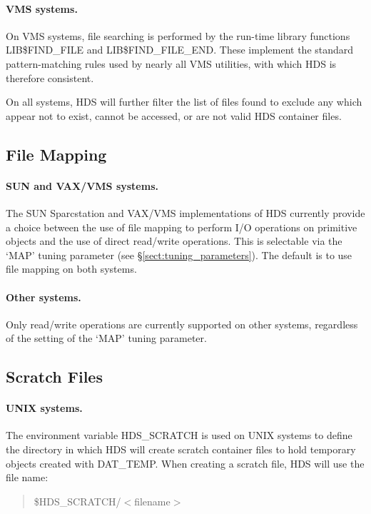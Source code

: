 \paragraph{VMS systems.} On VMS systems, file searching is performed by the
run-time library functions LIB\$FIND\_FILE and LIB\$FIND\_FILE\_END. These
implement the standard pattern-matching rules used by nearly all VMS utilities,
with which HDS is therefore consistent.

On all systems, HDS will further filter the list of files found to exclude any
which appear not to exist, cannot be accessed, or are not valid HDS container
files. 

\subsection{File Mapping}
\label{sect:system_map}

\paragraph{SUN and VAX/VMS systems.} The SUN Sparcstation and VAX/VMS
implementations of HDS currently provide a choice between the use of file
mapping to perform I/O operations on primitive objects and the use of direct
read/write operations. This is selectable via the `MAP' tuning parameter (see
\S\ref{sect:tuning_parameters}). The default is to use file mapping on both
systems.

\paragraph{Other systems.} Only read/write operations are currently supported on
other systems, regardless of the setting of the `MAP' tuning parameter.

\subsection{Scratch Files}

\paragraph{UNIX systems.} The environment variable HDS\_SCRATCH is used on UNIX
systems to define the directory in which HDS will create scratch container files
to hold temporary objects created with DAT\_TEMP. When creating a scratch file,
HDS will use the file name:

\begin{quote}
\$HDS\_SCRATCH/$<$filename$>$
\end{quote}

